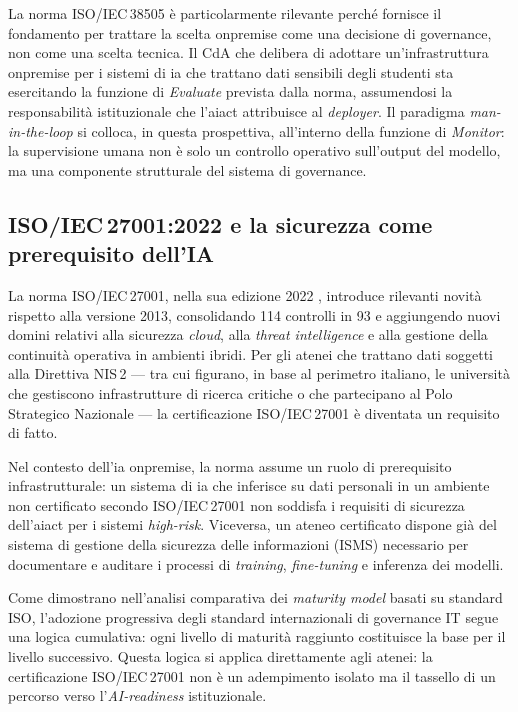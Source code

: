 La norma ISO/IEC\,38505 è particolarmente rilevante perché fornisce il fondamento per
trattare la scelta \gls{onpremise} come una decisione di governance, non
come una scelta tecnica. Il CdA che delibera di adottare un'infrastruttura
\gls{onpremise} per i sistemi di \gls{ia} che trattano dati sensibili degli studenti sta
esercitando la funzione di \textit{Evaluate} prevista dalla norma, assumendosi la
responsabilità istituzionale che l'\gls{aiact} attribuisce al \textit{deployer}. Il paradigma
\textit{man-in-the-loop} si colloca, in questa prospettiva, all'interno della funzione di
\textit{Monitor}: la supervisione umana non è solo un controllo operativo sull'output del
modello, ma una componente strutturale del sistema di governance.

\subsection{\texorpdfstring{ISO/IEC\,27001:2022}{ISO/IEC 27001:2022} e la sicurezza come prerequisito dell'IA}

La norma ISO/IEC\,27001, nella sua edizione 2022 \parencite{ISO27001}, introduce
rilevanti novità rispetto alla versione 2013, consolidando 114 controlli in 93 e
aggiungendo nuovi domini relativi alla sicurezza \textit{cloud}, alla \textit{threat
intelligence} e alla gestione della continuità operativa in ambienti ibridi. Per gli
atenei che trattano dati soggetti alla Direttiva NIS\,2 --- tra cui figurano, in base al
perimetro italiano, le università che gestiscono infrastrutture di ricerca critiche o che
partecipano al Polo Strategico Nazionale --- la certificazione ISO/IEC\,27001 è diventata
un requisito di fatto.

Nel contesto dell'\gls{ia} \gls{onpremise}, la norma assume un ruolo di
prerequisito infrastrutturale: un sistema di \gls{ia} che inferisce su dati personali
in un ambiente non certificato secondo ISO/IEC\,27001 non soddisfa i requisiti di
sicurezza dell'\gls{aiact} per i sistemi \textit{high-risk}. Viceversa, un ateneo certificato
dispone già del sistema di gestione della sicurezza delle informazioni (ISMS) necessario
per documentare e auditare i processi di \textit{training}, \textit{fine-tuning} e
inferenza dei modelli.

Come dimostrano \textcite{PatonRomero2018GreenIT} nell'analisi comparativa dei
\textit{maturity model} basati su standard ISO, l'adozione progressiva degli standard
internazionali di governance IT segue una logica cumulativa: ogni livello di maturità
raggiunto costituisce la base per il livello successivo. Questa logica si applica
direttamente agli atenei: la certificazione ISO/IEC\,27001 non è un adempimento isolato
ma il tassello di un percorso verso l'\textit{AI-readiness} istituzionale.

